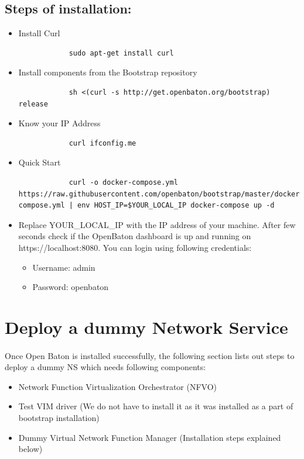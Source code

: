 		\subsection*{Steps of installation:}
		\begin{itemize}
			
			\item Install Curl
			\begin{lstlisting}
			sudo apt-get install curl 
			\end{lstlisting}
			
			\item Install components from the Bootstrap repository
			\begin{lstlisting}
			sh <(curl -s http://get.openbaton.org/bootstrap) release
			\end{lstlisting}
			
			\item Know your IP Address
			\begin{lstlisting}
			curl ifconfig.me
			\end{lstlisting}
			
			\item Quick Start
			\begin{lstlisting}
			curl -o docker-compose.yml https://raw.githubusercontent.com/openbaton/bootstrap/master/docker-compose.yml | env HOST_IP=$YOUR_LOCAL_IP docker-compose up -d
			\end{lstlisting}
			
			\item Replace YOUR\_LOCAL\_IP with the IP address of your machine. After few seconds check if the OpenBaton dashboard is up and running on https://localhost:8080.
			You can login using following credentials:
			\begin{itemize}
				\item Username: admin
				\item Password: openbaton
			\end{itemize}
		\end{itemize}
			
	\section{Deploy a dummy Network Service}
	\label{Deploy a dummy Network Service}
			\paragraph{}
			Once Open Baton is installed successfully, the following section lists out steps to deploy a dummy NS which needs following components:
			\begin{itemize}
				\item Network Function Virtualization Orchestrator (NFVO)
				\item Test VIM driver (We do not have to install it as it was installed as a part of bootstrap installation)
				\item Dummy Virtual Network Function Manager (Installation steps explained below)
			\end{itemize}
		

